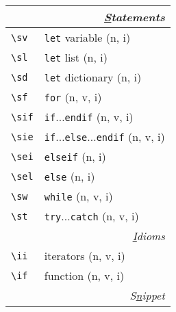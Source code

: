 \documentclass[oneside,10pt,landscape,DIV17]{scrartcl}
\begin{document}
\begin{multicols}{3}
\begin{center}
%
%
\begin{tabular}[]{|p{11mm}|p{56mm}|}
\hline
\multicolumn{2}{|r|}{\textsl{\underline{S}tatements}}\\[1.0ex]
\hline \verb'\sv'     & \verb'let' variable                              \hfill (n, i)\\
\hline \verb'\sl'     & \verb'let' list                                  \hfill (n, i)\\
\hline \verb'\sd'     & \verb'let' dictionary                            \hfill (n, i)\\
\hline \verb'\sf'     & \verb'for'                                       \hfill (n, v, i)\\
\hline \verb'\sif'    & \verb'if'$\ldots$\verb'endif'                    \hfill (n, v, i)\\
\hline \verb'\sie'    & \verb'if'$\ldots$\verb'else'$\ldots$\verb'endif' \hfill (n, v, i)\\
\hline \verb'\sei'    & \verb'elseif'                                    \hfill (n, i)\\
\hline \verb'\sel'    & \verb'else'                                      \hfill (n, i)\\
\hline \verb'\sw'     & \verb'while'                                     \hfill (n, v, i)\\
\hline \verb'\st'     & \verb'try'$\ldots$\verb'catch'                   \hfill (n, v, i)\\
\hline
\hline
\multicolumn{2}{|r|}{\textsl{\underline{I}dioms}}                 \\[1.0ex]
\hline \verb'\ii'  & iterators      \hfill (n, v, i)   \\
%
\hline \verb'\if' & function                  \hfill (n, v, i)\\
\hline
\hline
\multicolumn{2}{|r|}{\textsl{S\underline{n}ippet}}                \\[1.0ex]

\end{tabular}
\end{center}
\end{multicols}
\end{document}
